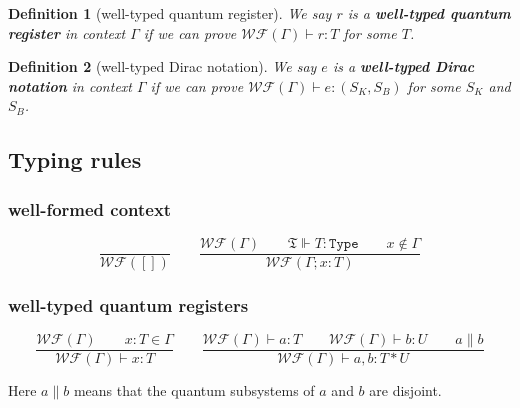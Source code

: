 \documentclass{article}
\newtheorem{dfn}{Definition}
\begin{document}
\begin{dfn}[well-typed quantum register]
  We say $r$ is a \textbf{well-typed quantum register} in context $\Gamma$ if we can prove $\mathcal{WF}(\Gamma) \vdash r : T$ for some $T$.
\end{dfn}

\begin{dfn}[well-typed Dirac notation]
  We say $e$ is a \textbf{well-typed Dirac notation} in context $\Gamma$ if we can prove $\mathcal{WF}(\Gamma) \vdash e : (S_K, S_B)$ for some $S_K$ and $S_B$.
\end{dfn}

\subsection{Typing rules}

\subsubsection*{well-formed context}

$$
\frac{}{\mathcal{WF}([])}
\qquad 
\frac{\mathcal{WF}(\Gamma)\qquad \mathfrak{T}\Vdash T : \texttt{Type}\qquad x \notin \Gamma}{\mathcal{WF}(\Gamma; x : T)}
$$

\subsubsection*{well-typed quantum registers}
$$
\frac{\mathcal{WF}(\Gamma)\qquad x:T \in \Gamma}{\mathcal{WF}(\Gamma) \vdash x : T}
\qquad
\frac{\mathcal{WF}(\Gamma)\vdash a : T\qquad \mathcal{WF}(\Gamma) \vdash b : U \qquad a \| b}{\mathcal{WF}(\Gamma) \vdash a, b : T * U}
$$

Here $a \| b$ means that the quantum subsystems of $a$ and $b$ are disjoint.
\end{document}

